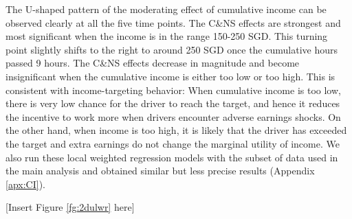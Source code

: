 \documentclass[reviewmode,AEJ]{AEA}
\begin{document}
The U-shaped pattern of the moderating effect of cumulative income can be observed clearly at all the five time points. The C\&NS effects are strongest and most significant when the income is in the range 150-250 SGD. This turning point slightly shifts to the right to around 250 SGD once the cumulative hours passed 9 hours. The C\&NS effects decrease in magnitude and become insignificant when the cumulative income is either too low or too high. This is consistent with income-targeting behavior: When cumulative income is too low, there is very low chance for the driver to reach the target, and hence it reduces the incentive to work more when drivers encounter adverse earnings shocks. On the other hand, when income is too high, it is likely that the driver has exceeded the target and extra earnings do not change the marginal utility of income. We also run these local weighted regression models with the subset of data used in the main analysis and obtained similar but less precise results (Appendix \ref{apx:CI}).


\begin{center}
	[Insert Figure \ref{fg:2dulwr} here]
\end{center}

\end{document}
